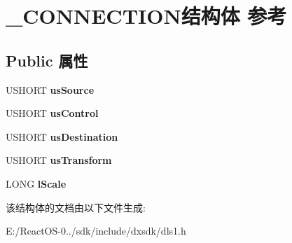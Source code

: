 \hypertarget{struct___c_o_n_n_e_c_t_i_o_n}{}\section{\+\_\+\+C\+O\+N\+N\+E\+C\+T\+I\+O\+N结构体 参考}
\label{struct___c_o_n_n_e_c_t_i_o_n}
\subsection*{Public 属性}
\begin{DoxyCompactItemize}
\item 
\mbox{\label{struct___c_o_n_n_e_c_t_i_o_n_acc5fb3da049f98624a99b5899582532e}} 
U\+S\+H\+O\+RT {\bfseries us\+Source}
\item 
\mbox{\label{struct___c_o_n_n_e_c_t_i_o_n_a8bd6a8f9200894ed42552cebc0a74f31}} 
U\+S\+H\+O\+RT {\bfseries us\+Control}
\item 
\mbox{\label{struct___c_o_n_n_e_c_t_i_o_n_acf3bbb2dae7a9556afb313398b66d9bb}} 
U\+S\+H\+O\+RT {\bfseries us\+Destination}
\item 
\mbox{\label{struct___c_o_n_n_e_c_t_i_o_n_afff452916c6c6dcb2e3d736df09cb6b3}} 
U\+S\+H\+O\+RT {\bfseries us\+Transform}
\item 
\mbox{\label{struct___c_o_n_n_e_c_t_i_o_n_a3d8b078849aa1fe2ef08bcb89c858daa}} 
L\+O\+NG {\bfseries l\+Scale}
\end{DoxyCompactItemize}


该结构体的文档由以下文件生成\+:\begin{DoxyCompactItemize}
\item 
E\+:/\+React\+O\+S-\/0../sdk/include/dxsdk/dls1.\+h\end{DoxyCompactItemize}
